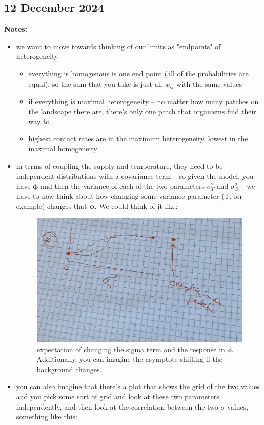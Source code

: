 \documentclass[12pt]{article}%
\begin{document}
\subsection{12 December 2024}

\textbf{Notes:}
\begin{itemize}
    \item we want to move towards thinking of our limits as "endpoints" of heterogeneity 
    \begin{itemize}
        \item everything is homogenous is one end point (all of the probabilities are equal), so the sum that you take is just all $w_{ij}$ with the same values 
        \item if everything is maximal heterogeneity -- no matter how many patches on the landscape there are, there's only one patch that organisms find their way to 
        \item highest contact rates are in the maximum heterogeneity, lowest in the maximal homogeneity
    \end{itemize}
    \item in terms of coupling the supply and temperature, they need to be independent distributions with a covariance term -- so given the model, you have $\mathbf{\phi}$ and then the variance of each of the two parameters $\sigma^2_T$ and $\sigma^2_S$ -- we have to now think about how changing some variance parameter (T, for example) changes that $\mathbf{\phi}$. We could think of it like: 

\begin{figure}[!hpt]
    \centering
    \includegraphics[width=0.65\linewidth]{notes-figs/phi-sigma-t.jpg}
    \caption{expectation of changing the sigma term and the response in $\phi$. Additionally, you can imagine the asymptote shifting if the background changes.}
\end{figure}

\item you can also imagine that there's a plot that shows the grid of the two values and you pick some sort of grid and look at these two parameters independently, and then look at the correlation between the two $\sigma$ values, something like this: 


\end{itemize}
\end{document}

